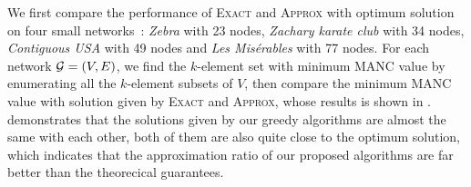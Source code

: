 \documentclass[sigconf]{acmart}
\begin{document}
We first compare the performance of \textsc{Exact} and \textsc{Approx} with optimum solution on four small networks~\cite{Ku13}: \textit{Zebra} with 23 nodes, \textit{Zachary karate club} with 34 nodes, \textit{Contiguous USA} with 49 nodes and \textit{Les Misérables} with 77 nodes.
For each network \(\mathcal{G}=(V,E)\), we find the \(k\)-element set with minimum MANC value by enumerating all the \(k\)-element subsets of \(V\), then compare the minimum MANC value with solution given by \textsc{Exact} and \textsc{Approx}, whose results is shown in .
 demonstrates that the solutions given by our greedy algorithms are almost the same with each other, both of them are also quite close to the optimum solution, which indicates that the approximation ratio of our proposed algorithms are far better than the theorecical guarantees.
\end{document}
